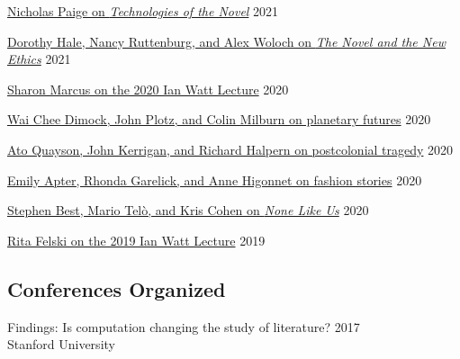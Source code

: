\documentclass[
  12pt,
  letterpaper,
]{article}
\begin{document}
\href{https://web.archive.org/web/20220429093420/https://novel.stanford.edu/csn-cafe/2021/7/23/nicholas-paige-technologies-of-the-novel-2821}{Nicholas
Paige on \emph{Technologies of the Novel}} \hfill 2021

\href{https://web.archive.org/web/20220429093353/https://novel.stanford.edu/csn-cafe/2021/7/23/books-at-the-center-dorothy-hale-the-novel-and-the-new-ethics-11521}{Dorothy
Hale, Nancy Ruttenburg, and Alex Woloch on \emph{The Novel and the New
Ethics}} \hfill 2021

\href{https://web.archive.org/web/20220429093326/https://novel.stanford.edu/csn-cafe/2021/7/23/sharon-marcus-on-her-ian-watt-lecture-103020}{Sharon
Marcus on the 2020 Ian Watt Lecture} \hfill 2020

\href{https://web.archive.org/web/20220429010109/https://novel.stanford.edu/csn-cafe/2021/7/23/wai-chee-dimock-john-plotz-and-colin-milburn-on-the-literature-of-planetary-futures-52319}{Wai
Chee Dimock, John Plotz, and Colin Milburn on planetary futures}
\hfill 2020

\href{https://web.archive.org/web/20220429010041/https://novel.stanford.edu/csn-cafe/2021/7/23/ato-quayson-john-kerrigan-and-richard-halpern-on-postcolonial-tragedy-91519}{Ato
Quayson, John Kerrigan, and Richard Halpern on postcolonial tragedy}
\hfill 2020

\href{https://web.archive.org/web/20220429093237/https://novel.stanford.edu/csn-cafe/2021/7/23/fashion-stories-emily-apter-rhonda-garelick-and-anne-higonnet-on-the-cultural-history-of-clothing-1920}{Emily
Apter, Rhonda Garelick, and Anne Higonnet on fashion stories}
\hfill 2020

\href{https://web.archive.org/web/20220429093211/https://novel.stanford.edu/csn-cafe/2021/7/23/books-at-the-center-stephen-best-mario-tel-and-kris-cohen-on-none-like-us-101019}{Stephen
Best, Mario Telò, and Kris Cohen on \emph{None Like Us}} \hfill 2020

\href{https://web.archive.org/web/20220429093144/https://novel.stanford.edu/csn-cafe/2021/7/23/rita-felski-on-her-2019-ian-watt-lecture-5319}{Rita
Felski on the 2019 Ian Watt Lecture} \hfill 2019

\hypertarget{conferences-organized}{%
\subsection{Conferences Organized}\label{conferences-organized}}

Findings: Is computation changing the study of literature? \hfill 2017\\
Stanford University
\end{document}
